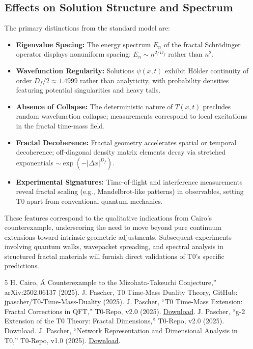 	\subsection{Effects on Solution Structure and Spectrum}
	
	The primary distinctions from the standard model are:
	
	\begin{itemize}
		\item \textbf{Eigenvalue Spacing:} The energy spectrum $E_n$ of the fractal Schrödinger operator displays nonuniform spacing: $E_n \sim n^{2/D_f}$ rather than $n^2$.
		\item \textbf{Wavefunction Regularity:} Solutions $\psi(x,t)$ exhibit Hölder continuity of order $D_f/2 \approx 1.4999$ rather than analyticity, with probability densities featuring potential singularities and heavy tails.
		\item \textbf{Absence of Collapse:} The deterministic nature of $T(x,t)$ precludes random wavefunction collapse; measurements correspond to local excitations in the fractal time-mass field.
		\item \textbf{Fractal Decoherence:} Fractal geometry accelerates spatial or temporal decoherence; off-diagonal density matrix elements decay via stretched exponentials $\sim \exp(-|\Delta x|^{D_f})$.
		\item \textbf{Experimental Signatures:} Time-of-flight and interference measurements reveal fractal scaling (e.g., Mandelbrot-like patterns) in observables, setting T0 apart from conventional quantum mechanics.
	\end{itemize}
	
	These features correspond to the qualitative indications from Cairo's counterexample, underscoring the need to move beyond pure continuum extensions toward intrinsic geometric adjustments. Subsequent experiments involving quantum walks, wavepacket spreading, and spectral analysis in structured fractal materials will furnish direct validations of T0's specific predictions.
		\begin{thebibliography}{5}
		 H. Cairo, Ä Counterexample to the Mizohata-Takeuchi Conjecture,'' arXiv:2502.06137 (2025).
		 J. Pascher, T0 Time-Mass Duality Theory, GitHub: jpascher/T0-Time-Mass-Duality (2025).
		 J. Pascher, ``T0 Time-Mass Extension: Fractal Corrections in QFT,'' T0-Repo, v2.0 (2025). \href{https://github.com/jpascher/T0-Time-Mass-Duality/raw/main/2/tex/T0_tm-erweiterung-x6_De.tex}{Download}.
		 J. Pascher, ``g-2 Extension of the T0 Theory: Fractal Dimensions,'' T0-Repo, v2.0 (2025). \href{https://github.com/jpascher/T0-Time-Mass-Duality/raw/main/2/tex/T0_g2-erweiterung-4_De.tex}{Download}.
		 J. Pascher, ``Network Representation and Dimensional Analysis in T0,'' T0-Repo, v1.0 (2025). \href{https://github.com/jpascher/T0-Time-Mass-Duality/raw/main/2/tex/T0_netze_De.tex}{Download}.
	\end{thebibliography}